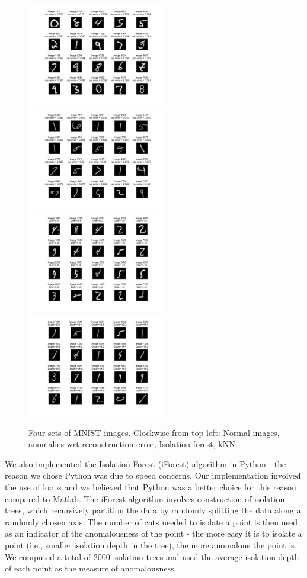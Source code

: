 \documentclass[10pt,twocolumn,letterpaper]{article}
\begin{document}
\begin{figure}[ht!]
\centering
\includegraphics[width=60mm]{figs/normal.png}
\includegraphics[width=60mm]{figs/top_rec_error.png}
\includegraphics[width=60mm]{figs/top_dist.png}
\includegraphics[width=60mm]{figs/iforest_error.png}
\caption{Four sets of MNIST images. Clockwise from top left: Normal images, anomalies wrt reconstruction error, Isolation forest, kNN.}\label{overflow}
\end{figure}
We also implemented the Isolation Forest (iForest) algorithm in Python - the reason we chose Python was due to speed concerns. Our implementation involved the use of loops and we believed that Python was a better choice for this reason compared to Matlab. The iForest algorithm involves construction of isolation trees, which recursively partition the data by randomly splitting the data along a randomly chosen axis. The number of cuts needed to isolate a point is then used as an indicator of the anomalousness of the point - the more easy it is to isolate a point (i.e., smaller isolation depth in the tree), the more anomalous the point is. We computed a total of 2000 isolation trees and used the average isolation depth of each point as the measure of anomalousness.
\end{document}
